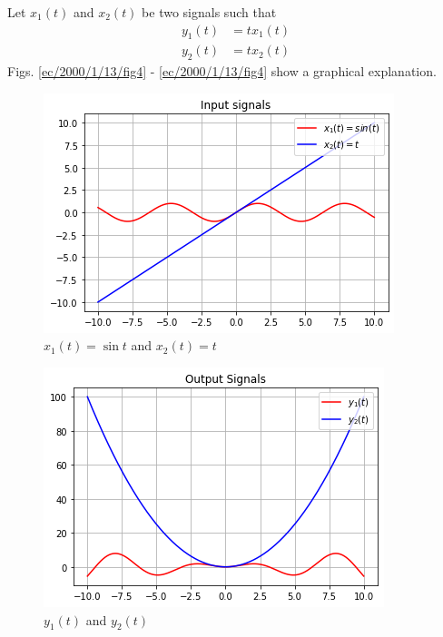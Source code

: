 Let $x_1(t)$ and $x_2(t)$ be two signals such that
\begin{align}
    y_1(t)&=tx_1(t)\\
    y_2(t)&=tx_2(t)
\end{align}
Figs. \ref{ec/2000/1/13/fig4}
 - \ref{ec/2000/1/13/fig4}
 show a graphical explanation.
\begin{figure}[!ht]
\centering
 \includegraphics[width=\columnwidth]{solutions/ec/2000/1/13/figures/input signals.png}
 \caption{$x_1(t) = \sin{t}$ and $x_2(t) = t$}
 \label{ec/2000/1/13/fig1}
 \end{figure}
\begin{figure}[!ht]
\centering
 \includegraphics[width=\columnwidth]{solutions/ec/2000/1/13/figures/output signals.png}
 \caption{$y_1(t)$ and  $y_2(t)$}
 \end{figure}
